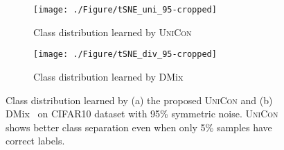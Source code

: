 \documentclass[10pt,twocolumn,letterpaper]{article}
\begin{document}
\begin{figure*}[ht]
  \centering
  \begin{subfigure}{0.45\linewidth}
  \vspace{5mm}
    \texttt{[image: ./Figure/tSNE\_uni\_95-cropped]}
    \caption{Class distribution learned by \textsc{UniCon}}
    \label{fig:tsNE_uni}
  \end{subfigure}
  \hfill
\begin{subfigure}{0.45\linewidth}
  \vspace{5mm}
    \texttt{[image: ./Figure/tSNE\_div\_95-cropped]}
    \caption{Class distribution learned by DMix~\cite{li2020dividemix}}
    \label{fig:tSNE_div}
  \end{subfigure}
  \caption{Class distribution learned by (a) the proposed \textsc{UniCon}  and (b) DMix~\cite{li2020dividemix} on CIFAR10 dataset with 95\% symmetric noise. \textsc{UniCon} shows better class separation even when only 5\% samples have correct labels.}
  \label{fig:tSNE_95}
\end{figure*}
\end{document}
